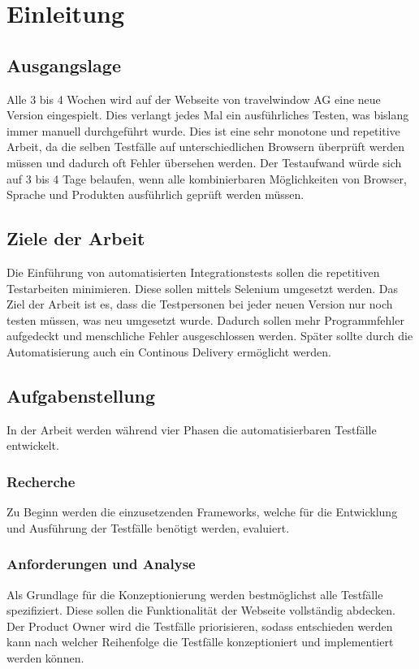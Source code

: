 \chapter{Einleitung}

\section{Ausgangslage}
Alle 3 bis 4 Wochen wird auf der Webseite von travelwindow AG eine neue Version eingespielt. Dies verlangt jedes Mal ein ausführliches Testen, was bislang immer manuell durchgeführt wurde. Dies ist eine sehr monotone und repetitive Arbeit, da die selben Testfälle auf unterschiedlichen Browsern überprüft werden müssen und dadurch oft Fehler übersehen werden. Der Testaufwand würde sich auf 3 bis 4 Tage belaufen, wenn alle kombinierbaren Möglichkeiten von Browser, Sprache und Produkten ausführlich geprüft werden müssen.

\section{Ziele der Arbeit}
\label{sec:desc:targets}
Die Einführung von automatisierten Integrationstests sollen die repetitiven Testarbeiten minimieren. Diese sollen mittels Selenium umgesetzt werden.
Das Ziel der Arbeit ist es, dass die Testpersonen bei jeder neuen Version nur noch testen müssen, was neu umgesetzt wurde.  Dadurch sollen mehr Programmfehler aufgedeckt und menschliche Fehler ausgeschlossen werden.
Später sollte durch die Automatisierung auch ein Continous Delivery ermöglicht werden.

\section{Aufgabenstellung}
In der Arbeit werden während vier Phasen die automatisierbaren Testfälle entwickelt. 

\subsection{Recherche}
Zu Beginn werden die einzusetzenden Frameworks, welche für die Entwicklung und Ausführung der Testfälle benötigt werden, evaluiert.

\subsection{Anforderungen und Analyse}
Als Grundlage für die Konzeptionierung werden bestmöglichst alle Testfälle spezifiziert. Diese sollen die Funktionalität der Webseite vollständig abdecken. Der Product Owner wird die Testfälle priorisieren, sodass entschieden werden kann nach welcher Reihenfolge die Testfälle konzeptioniert und implementiert werden können.

